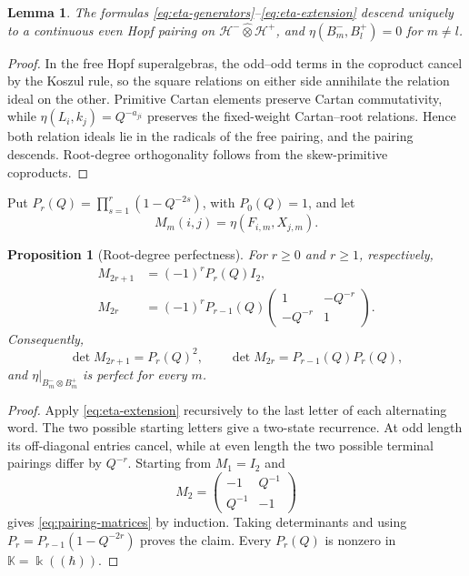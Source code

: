 \documentclass[11pt,a4paper]{article}
\newcommand{\kk}{\Bbbk}
\newcommand{\hK}{\mathbb K}
\newcommand{\ot}{\otimes}
\newcommand{\hot}{\widehat\otimes}
\newtheorem{proposition}[theorem]{Proposition}
\newtheorem{lemma}[theorem]{Lemma}
\theoremstyle{definition}
\theoremstyle{remark}
\begin{document}
\begin{lemma}\label{lem:pairing-descends}
The formulas \eqref{eq:eta-generators}--\eqref{eq:eta-extension} descend
uniquely to a continuous even Hopf pairing on
\(\mathcal H^-\hot\mathcal H^+\), and
\(\eta(B_m^-,B_l^+)=0\) for \(m\neq l\).
\end{lemma}

\begin{proof}
In the free Hopf superalgebras, the odd--odd terms in the coproduct cancel
by the Koszul rule, so the square relations on either side annihilate the
relation ideal on the other.  Primitive Cartan elements preserve Cartan
commutativity, while
\(\eta(L_i,k_j)=Q^{-a_{ji}}\) preserves the fixed-weight
Cartan--root relations.  Hence both relation ideals lie in the radicals
of the free pairing, and the pairing descends.  Root-degree orthogonality
follows from the skew-primitive coproducts.
\end{proof}

Put \(P_r(Q)=\prod_{s=1}^r(1-Q^{-2s})\), with \(P_0(Q)=1\), and let
\[
 M_m(i,j)=\eta(F_{i,m},X_{j,m}).
\]

\begin{proposition}[Root-degree perfectness]\label{prop:perfect-pairing}
For \(r\geq0\) and \(r\geq1\), respectively,
\begin{equation}\label{eq:pairing-matrices}
\begin{aligned}
 M_{2r+1}&=(-1)^rP_r(Q)I_2,\\
 M_{2r}&=(-1)^rP_{r-1}(Q)
 \begin{pmatrix}1&-Q^{-r}\\-Q^{-r}&1\end{pmatrix}.
\end{aligned}
\end{equation}
Consequently,
\[
 \det M_{2r+1}=P_r(Q)^2,\qquad
 \det M_{2r}=P_{r-1}(Q)P_r(Q),
\]
and \(\eta|_{B_m^-\ot B_m^+}\) is perfect for every \(m\).
\end{proposition}

\begin{proof}
Apply \eqref{eq:eta-extension} recursively to the last letter of each
alternating word.  The two possible starting letters give a two-state
recurrence.  At odd length its off-diagonal entries cancel, while at even
length the two possible terminal pairings differ by \(Q^{-r}\).  Starting
from \(M_1=I_2\) and
\[
 M_2=\begin{pmatrix}-1&Q^{-1}\\Q^{-1}&-1\end{pmatrix}
\]
gives \eqref{eq:pairing-matrices} by induction.  Taking determinants and
using \(P_r=P_{r-1}(1-Q^{-2r})\) proves the claim.  Every \(P_r(Q)\) is
nonzero in \(\hK=\kk((\hbar))\).
\end{proof}
\end{document}
